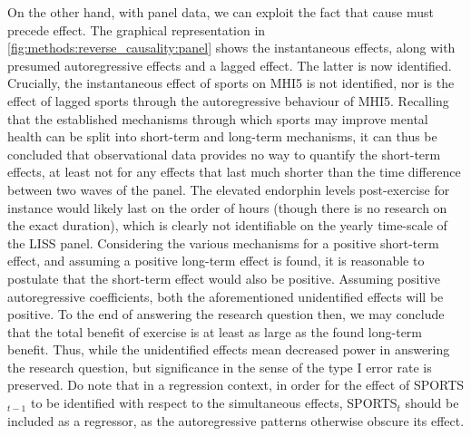 On the other hand, with panel data, we can exploit the fact that cause must precede effect. The graphical representation
in \cref{fig:methods:reverse_causality:panel} shows the instantaneous effects, along with presumed
autoregressive effects and a lagged effect.
The latter is now identified. Crucially, the instantaneous effect of sports on MHI5 is not identified, nor is the effect
of lagged sports through the autoregressive behaviour of MHI5.
Recalling that the established mechanisms through which sports may improve mental health can be split into short-term
and long-term mechanisms, it can thus be concluded that observational data provides no way to quantify the short-term effects,
at least not for any effects that last much shorter than the time difference between two waves of the panel.
The elevated endorphin levels post-exercise for instance would likely last on the order of hours (though there is no
research on the exact duration), which is clearly not identifiable on the yearly time-scale of the LISS panel.
Considering the various mechanisms for a positive short-term effect, and assuming a positive long-term effect is found,
it is reasonable to postulate that the short-term effect would also be positive.
Assuming positive autoregressive coefficients, both the aforementioned unidentified effects will be positive.
To the end of answering the research question then, we may conclude that the total benefit of exercise is at least
as large as the found long-term benefit. Thus, while the unidentified effects mean decreased power in answering
the research question, but significance in the sense of the type I error rate is preserved.
Do note that in a regression context, in order for the effect of SPORTS$_{t-1}$ to be identified with respect to the simultaneous
effects, SPORTS$_t$ should be included as a regressor, as the autoregressive patterns otherwise obscure its effect.

